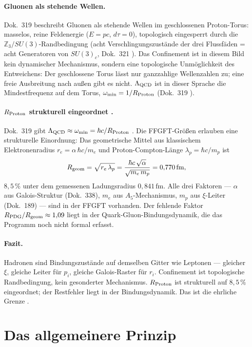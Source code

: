 \paragraph{Gluonen als stehende Wellen.}
Dok.~319 beschreibt Gluonen als stehende Wellen im geschlossenen Proton-Torus:
masselos, reine Feldenergie ($E = pc$, $d\tau = 0$), topologisch eingesperrt
durch die $\mathbb Z_3/SU(3)$-Randbedingung (acht Verschlingungszustände
der drei Flussfäden = acht Generatoren von $SU(3)_c$, Dok.~321 \BM). Das
Confinement ist in diesem Bild kein dynamischer Mechanismus, sondern eine
topologische Unmöglichkeit des Entweichens: Der geschlossene Torus lässt
nur ganzzahlige Wellenzahlen zu; eine freie Ausbreitung nach außen gibt es
nicht. $\Lambda_{\rm QCD}$ ist in dieser Sprache die Mindestfrequenz auf
dem Torus, $\omega_{\min} = 1/R_{\rm Proton}$ (Dok.~319 \SM).

\paragraph{$R_{\rm Proton}$ strukturell eingeordnet \SM.}
Dok.~319 gibt $\Lambda_{\rm QCD} \approx \omega_{\min} = \hbar c/R_{\rm Proton}$
\SM. Die FFGFT-Größen erlauben eine strukturelle Einordnung: Das geometrische
Mittel aus klassischem Elektronenradius $r_e = \alpha\,\hbar c/m_e$ und
Proton-Compton-Länge $\lambda_p = \hbar c/m_p$ ist
\[
  R_{\rm geom} = \sqrt{r_e\,\lambda_p}
  = \frac{\hbar c\,\sqrt{\alpha}}{\sqrt{m_e\,m_p}}
  = 0{,}770\,\text{fm},
\]
$8{,}5\,\%$ unter dem gemessenen Ladungsradius $0{,}841\,\text{fm}$.
Alle drei Faktoren --- $\alpha$ aus Galois-Struktur (Dok.~338), $m_e$ aus
$A_5$-Mechanismus, $m_p$ aus $\xi$-Leiter (Dok.~189) --- sind in der FFGFT
vorhanden. Der fehlende Faktor $R_{\rm PDG}/R_{\rm geom} \approx 1{,}09$ liegt in der
Quark-Gluon-Bindungsdynamik, die das Programm noch nicht formal erfasst.

\paragraph{Fazit.}
Hadronen sind Bindungszustände auf demselben Gitter wie Leptonen --- gleicher
$\xi$, gleiche Leiter für $p_i$, gleiche Galois-Raster für $r_i$. Confinement
ist topologische Randbedingung, kein gesonderter Mechanismus. $R_{\rm Proton}$
ist strukturell auf $8{,}5\,\%$ eingeordnet; der Restfehler liegt in der
Bindungsdynamik. Das ist die ehrliche Grenze \SM.

\section{Das allgemeinere Prinzip}
\label{sec:prinzip}

